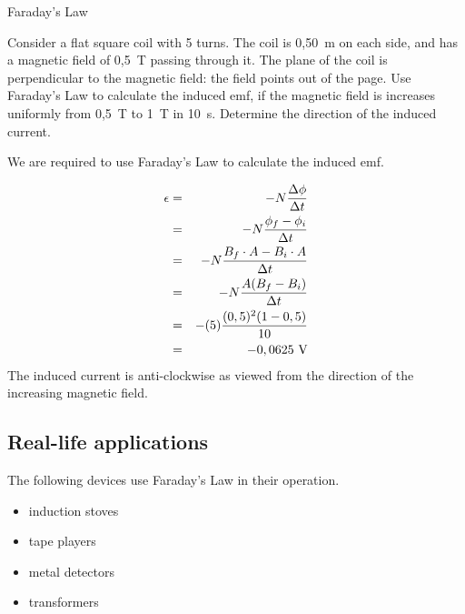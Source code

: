 {

\begin{wex}
{Faraday's Law} {Consider a flat square coil with 5 turns. The
coil is 0,50~m on each side, and has a magnetic field of 0,5~T
passing through it. The plane of the coil is perpendicular to the
magnetic field: the field points out of the page. Use Faraday's
Law to calculate the induced emf, if the magnetic field is
increases uniformly from 0,5~T to 1~T in 10~s. Determine the
direction of the induced current.

} { We are required to use
Faraday's Law to calculate the induced emf.

 

\begin{eqnarray*}
\epsilon&=&-N\frac{\Delta \phi}{\Delta t}\\
&=&-N\frac{\phi_f-\phi_i}{\Delta t}\\
&=&-N\frac{B_f\cdot A-B_i\cdot A}{\Delta t}\\
&=&-N\frac{A(B_f -B_i)}{\Delta t}\\
&=&-(5)\frac{(0,5)^2(1-0,5)}{10}\\
&=&-0,0625~\rm{V}
\end{eqnarray*}
The induced current is anti-clockwise as viewed from the direction of the increasing magnetic field.
}
\end{wex}

\subsection{Real-life applications}
The following devices use Faraday's Law in their operation.
\begin{itemize}
\item{induction stoves}
\item{tape players}
\item{metal detectors}
\item{transformers}
\end{itemize}


}
